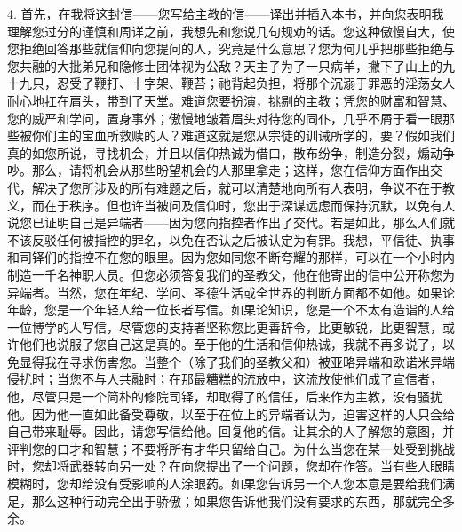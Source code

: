 4. 首先，在我将这封信——您写给主教的信——译出并插入本书，并向您表明我理解您过分的谨慎和周详之前，我想先和您说几句规劝的话。您这种傲慢自大，使您拒绝回答那些就信仰向您提问的人，究竟是什么意思？您为何几乎把那些拒绝与您共融的大批弟兄和隐修士团体视为公敌？天主子为了一只病羊，撇下了山上的九十九只，忍受了鞭打、十字架、鞭苔；祂背起负担，将那个沉溺于罪恶的淫荡女人耐心地扛在肩头，带到了天堂。难道您要扮演，挑剔的主教；凭您的财富和智慧、您的威严和学问，置身事外；傲慢地皱着眉头对待您的同仆，几乎不屑于看一眼那些被你们主的宝血所救赎的人？难道这就是您从宗徒的训诫所学的，要？假如我们真的如您所说，寻找机会，并且以信仰热诚为借口，散布纷争，制造分裂，煽动争吵。那么，请将机会从那些盼望机会的人那里拿走；这样，您在信仰方面作出交代，解决了您所涉及的所有难题之后，就可以清楚地向所有人表明，争议不在于教义，而在于秩序。但也许当被问及信仰时，您出于深谋远虑而保持沉默，以免有人说您已证明自己是异端者——因为您向指控者作出了交代。若是如此，那么人们就不该反驳任何被指控的罪名，以免在否认之后被认定为有罪。我想，平信徒、执事和司铎们的指控不在您的眼里。因为您如同您不断夸耀的那样，可以在一个小时内制造一千名神职人员。但您必须答复我们的圣教父，他在他寄出的信中公开称您为异端者。当然，您在年纪、学问、圣德生活或全世界的判断方面都不如他。如果论年龄，您是一个年轻人给一位长者写信。如果论知识，您是一个不太有造诣的人给一位博学的人写信，尽管您的支持者坚称您比更善辞令，比更敏锐，比更智慧，或许他们也说服了您自己这是真的。至于他的生活和信仰热诚，我就不再多说了，以免显得我在寻求伤害您。当整个（除了我们的圣教父和）被亚略异端和欧诺米异端侵扰时；当您不与人共融时；在那最糟糕的流放中，这流放使他们成了宣信者，他，尽管只是一个简朴的修院司铎，却取得了的信任，后来作为主教，没有骚扰他。因为他一直如此备受尊敬，以至于在位上的异端者认为，迫害这样的人只会给自己带来耻辱。因此，请您写信给他。回复他的信。让其余的人了解您的意图，并评判您的口才和智慧；不要将所有才华只留给自己。为什么当您在某一处受到挑战时，您却将武器转向另一处？在向您提出了一个问题，您却在作答。当有些人眼睛模糊时，您却给没有受影响的人涂眼药。如果您告诉另一个人您本意是要给我们满足，那么这种行动完全出于骄傲；如果您告诉他我们没有要求的东西，那就完全多余。\par

